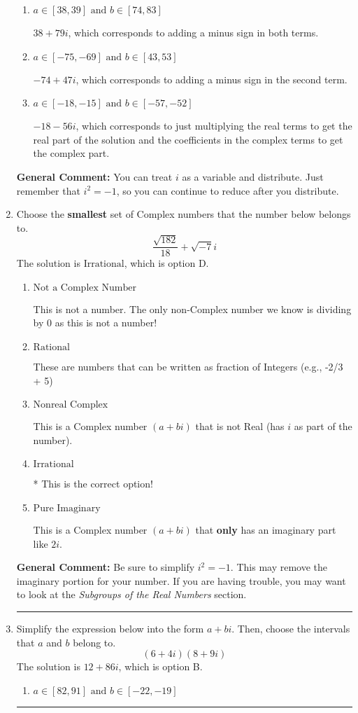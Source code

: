 \documentclass{extbook}[14pt]
\newcommand{\litem}[1]{\item #1

\rule{\textwidth}{0.4pt}}
\begin{document}
\begin{enumerate}
{\begin{enumerate}[label=\Alph*.]
 $-74 - 47 i$, which corresponds to adding a minus sign in the first term.
\item \( a \in [38, 39] \text{ and } b \in [74, 83] \)

 $38 + 79 i$, which corresponds to adding a minus sign in both terms.
\item \( a \in [-75, -69] \text{ and } b \in [43, 53] \)

 $-74 + 47 i$, which corresponds to adding a minus sign in the second term.
\item \( a \in [-18, -15] \text{ and } b \in [-57, -52] \)

 $-18 - 56 i$, which corresponds to just multiplying the real terms to get the real part of the solution and the coefficients in the complex terms to get the complex part.
\end{enumerate}

\textbf{General Comment:} You can treat $i$ as a variable and distribute. Just remember that $i^2=-1$, so you can continue to reduce after you distribute.
}
\litem{
Choose the \textbf{smallest} set of Complex numbers that the number below belongs to.
\[ \frac{\sqrt{182}}{18}+\sqrt{-7}i \]The solution is \( \text{Irrational} \), which is option D.\begin{enumerate}[label=\Alph*.]
\item \( \text{Not a Complex Number} \)

This is not a number. The only non-Complex number we know is dividing by 0 as this is not a number!
\item \( \text{Rational} \)

These are numbers that can be written as fraction of Integers (e.g., -2/3 + 5)
\item \( \text{Nonreal Complex} \)

This is a Complex number $(a+bi)$ that is not Real (has $i$ as part of the number).
\item \( \text{Irrational} \)

* This is the correct option!
\item \( \text{Pure Imaginary} \)

This is a Complex number $(a+bi)$ that \textbf{only} has an imaginary part like $2i$.
\end{enumerate}

\textbf{General Comment:} Be sure to simplify $i^2 = -1$. This may remove the imaginary portion for your number. If you are having trouble, you may want to look at the \textit{Subgroups of the Real Numbers} section.
}
\litem{
Simplify the expression below into the form $a+bi$. Then, choose the intervals that $a$ and $b$ belong to.
\[ (6 + 4 i)(8 + 9 i) \]The solution is \( 12 + 86 i \), which is option B.\begin{enumerate}[label=\Alph*.]
\item \( a \in [82, 91] \text{ and } b \in [-22, -19] \)


\end{enumerate}}
\end{enumerate}
\end{document}
